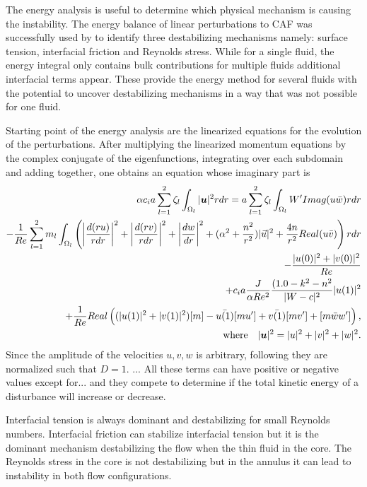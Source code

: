 The energy analysis is useful to determine which physical mechanism is causing the instability. 
The energy balance of linear perturbations to CAF was successfully used by \cite{SCAF2} to identify three destabilizing mechanisms namely: surface tension, interfacial friction and Reynolds stress. 
While for a single fluid, the energy integral only contains bulk contributions for multiple fluids additional interfacial terms appear. 
These provide the energy method for several fluids with the potential to uncover destabilizing mechanisms in a way that was not possible for one fluid.\par
Starting point of the energy analysis are the linearized equations for the evolution of the perturbations. 
After multiplying the linearized momentum equations by the complex conjugate of the eigenfunctions, integrating over each subdomain and adding together, one obtains an equation whose imaginary part is
\begin{eqnarray*}
\alpha  c_i a \sum \limits_{l=1}^2 \zeta_l \int_{\Omega_l}  |\mbox{\boldmath{${u}$}}|^2 r dr = a \sum \limits_{l=1}^2 \zeta_l \int_{\Omega_l}  W' Imag(u \bar{w}) r dr \\
-\frac{1}{Re} \sum \limits_{l=1}^2 m_l \int_{\Omega_l} \left( \bigg|\frac{d(r u)}{r dr}\bigg|^2+\bigg|\frac{d(r v)}{r dr}\bigg|^2+\bigg|\frac{dw}{dr}\bigg|^2 + (\alpha^2 +\frac{n^2}{r^2}) |\vec{u}|^2 + \frac{4n}{r^2} Real(u\bar{v})\right) r dr \\
- \frac{|u(0)|^2+|v(0)|^2}{Re} \\
+ c_i a \frac{J}{\alpha Re^2} \frac{(1.0 - k^2 - n^2}{|W-c|^2} |u(1)|^2 \\
+ \frac{1}{Re} Real\left(( |u(1)|^2+|v(1)|^2 ) [m] - \bar{u(1)} [m u'] + \bar{v(1)} [m v'] + [m \bar{w} w'] \right), \\
\mbox{where} \quad |\mbox{\boldmath{${u}$}}|^2 = |u|^2+|v|^2+|w|^2.
\end{eqnarray*}
Since the amplitude of the velocities $u,v,w$ is arbitrary, following \cite{SCAF2} they are normalized such that $D=1$. 
...
All these terms can have positive or negative values except for...
and they compete to determine if the total kinetic energy of a disturbance will increase or decrease. 
\par
Interfacial tension is always dominant and destabilizing for small Reynolds numbers. 
Interfacial friction can stabilize interfacial tension but it is the dominant mechanism destabilizing the flow when the thin fluid in the core. 
The Reynolds stress in the core is not destabilizing but in the annulus it can lead to instability in both flow configurations. 

